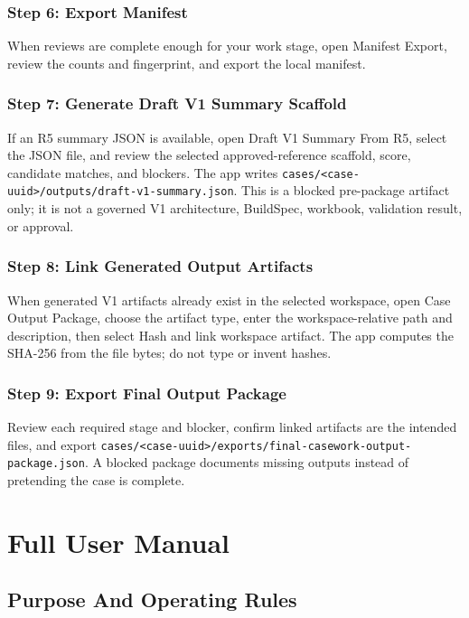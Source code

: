\section{Step 6: Export Manifest}

When reviews are complete enough for your work stage, open Manifest Export, review the counts and fingerprint, and export the local manifest.

\section{Step 7: Generate Draft V1 Summary Scaffold}

If an R5 summary JSON is available, open Draft V1 Summary From R5, select the JSON file, and review the selected approved-reference scaffold, score, candidate matches, and blockers. The app writes \texttt{cases/\textless case-uuid\textgreater/outputs/draft-v1-summary.json}. This is a blocked pre-package artifact only; it is not a governed V1 architecture, BuildSpec, workbook, validation result, or approval.

\section{Step 8: Link Generated Output Artifacts}

When generated V1 artifacts already exist in the selected workspace, open Case Output Package, choose the artifact type, enter the workspace-relative path and description, then select Hash and link workspace artifact. The app computes the SHA-256 from the file bytes; do not type or invent hashes.

\section{Step 9: Export Final Output Package}

Review each required stage and blocker, confirm linked artifacts are the intended files, and export \texttt{cases/\textless case-uuid\textgreater/exports/final-casework-output-package.json}. A blocked package documents missing outputs instead of pretending the case is complete.

\part{Full User Manual}

\chapter{Purpose And Operating Rules}

